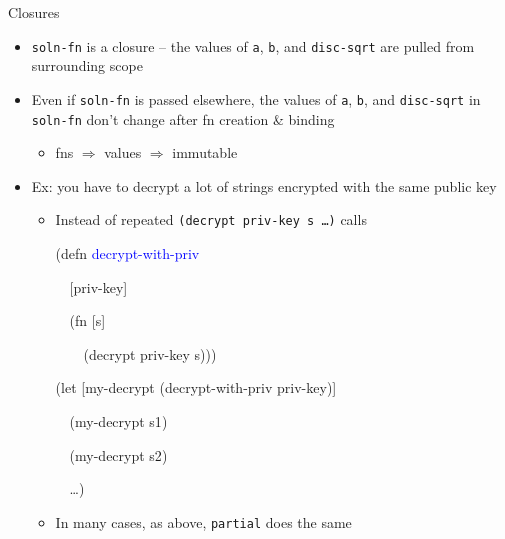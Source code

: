 \documentclass{beamer}
\begin{document}
\begin{frame}{Closures}
  \begin{itemize}
  \item \texttt{soln-fn} is a closure -- the values of
    \texttt{a}, \texttt{b}, and \texttt{disc-sqrt} are pulled from surrounding scope
  \item Even if \texttt{soln-fn} is passed elsewhere, the values of
    \texttt{a}, \texttt{b}, and \texttt{disc-sqrt} in \texttt{soln-fn} don't change after fn creation \&
    binding 
    \begin{itemize}
    \item fns $\Rightarrow$ values $\Rightarrow$ immutable
    \end{itemize}
  \item Ex: you have to decrypt a lot of strings encrypted with the
    same public key
    \begin{itemize}
    \item Instead of repeated \texttt{(decrypt priv-key s \ldots)}
      calls\\
\begin{small}
{\ttfamily\color{black}
%
\textcolor[rgb]{0.54901963,0.54901963,0.54901963}{(}\textcolor[rgb]{0.49803922,0.0,0.49803922}{defn}
\textcolor{blue}{decrypt-with-priv}}

{\ttfamily\color{black}
\ \ [priv-key]}

{\ttfamily\color{black}
\ \ \textcolor[rgb]{0.54901963,0.54901963,0.54901963}{(}\textcolor[rgb]{0.49803922,0.0,0.49803922}{fn}
[s]}

{\ttfamily\color{black}
\ \ \ \ \textcolor[rgb]{0.54901963,0.54901963,0.54901963}{(}decrypt
priv-key s\textcolor[rgb]{0.54901963,0.54901963,0.54901963}{)))}}


\bigskip

{\ttfamily\color{black}
\textcolor[rgb]{0.54901963,0.54901963,0.54901963}{(}\textcolor[rgb]{0.49803922,0.0,0.49803922}{let}
[my-decrypt
\textcolor[rgb]{0.54901963,0.54901963,0.54901963}{(}decrypt-with-priv
priv-key\textcolor[rgb]{0.54901963,0.54901963,0.54901963}{)}]}

{\ttfamily\color{black}
\ \ \textcolor[rgb]{0.54901963,0.54901963,0.54901963}{(}my-decrypt
s1\textcolor[rgb]{0.54901963,0.54901963,0.54901963}{)}}

{\ttfamily\color{black}
\ \ \textcolor[rgb]{0.54901963,0.54901963,0.54901963}{(}my-decrypt
s2\textcolor[rgb]{0.54901963,0.54901963,0.54901963}{)}}

{\ttfamily\color{black}
\ \ \ldots\textcolor[rgb]{0.54901963,0.54901963,0.54901963}{)}}
\end{small}
    \item In many cases, as above, \texttt{partial} does the same
    \end{itemize}
  \end{itemize}
\end{frame}
\end{document}

